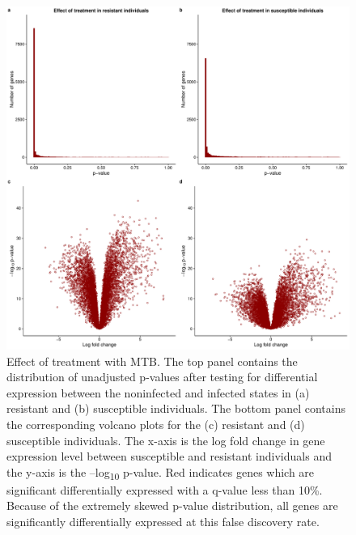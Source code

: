 \documentclass[fleqn,10pt]{wlscirep}
\begin{document}
\begin{figure}[ht]
\centering
\includegraphics[width=\linewidth]{../figure/limma-supp.pdf}
\caption{
Effect of treatment with MTB. The top panel contains the distribution of unadjusted p-values after testing for differential expression between the noninfected and infected states in (a) resistant and (b) susceptible individuals. The bottom panel contains the corresponding volcano plots for the (c) resistant and (d) susceptible individuals. The x-axis is the log fold change in gene expression level between susceptible and resistant individuals and the y-axis is the –log\textsubscript{10} p-value. Red indicates genes which are significant differentially expressed with a q-value less than 10\%. Because of the extremely skewed p-value distribution, all genes are significantly differentially expressed at this false discovery rate.
}
\label{fig:limma-supp}
\end{figure}
\end{document}
